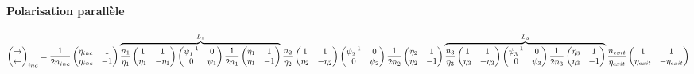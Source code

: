 \documentclass[a4paper,english]{article}
\begin{document}
\paragraph{Polarisation parallèle}
\begin{dmath}
\begin{pmatrix}\rightarrow \\ \leftarrow \end{pmatrix}_{inc} = 
\frac{1}{2 n_{inc}} \begin{pmatrix} \eta_{inc} & 1 \\ \eta_{inc} & -1 \end{pmatrix} \overbrace{ \frac{n_1}{\eta_1} \begin{pmatrix} 1 & 1 \\ \eta_1 & -\eta_1 \end{pmatrix}
\begin{pmatrix} \psi_1^{-1} & 0 \\ 0 & \psi_1 \end{pmatrix}
\frac{1}{2 n_1} \begin{pmatrix} \eta_1 & 1 \\ \eta_1 & -1 \end{pmatrix} }^{L_1} \frac{n_2}{\eta_2} \begin{pmatrix} 1 & 1 \\ \eta_2 & -\eta_2 \end{pmatrix}
\begin{pmatrix} \psi_2^{-1} & 0 \\ 0 & \psi_2 \end{pmatrix} \\
\frac{1}{2 n_2} \begin{pmatrix} \eta_2 & 1 \\ \eta_2 & -1 \end{pmatrix} \overbrace{ \frac{n_3}{\eta_3} \begin{pmatrix} 1 & 1 \\ \eta_3 & -\eta_3 \end{pmatrix}
\begin{pmatrix} \psi_3^{-1} & 0 \\ 0 & \psi_3 \end{pmatrix}
\frac{1}{2 n_3} \begin{pmatrix} \eta_3 & 1 \\ \eta_3 & -1 \end{pmatrix} }^{L_3} \frac{n_{exit}}{\eta_{exit}} \begin{pmatrix} 1 & 1 \\ \eta_{exit} & -\eta_{exit} \end{pmatrix}

\end{dmath}
\end{document}
